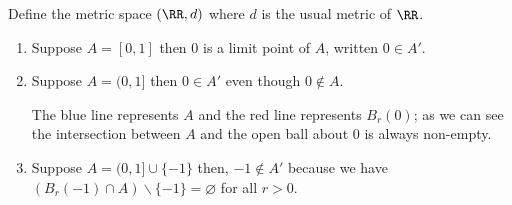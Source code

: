 \documentclass[12pt, a4paper]{article}
\begin{document}
\begin{mdexample}
    Define the metric space \((\RR,d)\) where \(d\) is the usual metric of \(\RR\).
    \begin{enumerate}
        \item Suppose \(A = [0,1]\) then \(0\) is a limit point of \(A\), written \(0 \in A'\).
        \item Suppose \(A = (0,1]\) then \( 0\in A'\) even though \(0 \not\in A\).
        \begin{figure}[H]
             \begin{center}
             \end{center}
        \end{figure}
        The blue line represents \(A\) and the red line represents \(B_r(0)\); as we can see the intersection between \(A\) and the open ball about \(0\) is always non-empty.
        \item Suppose \(A = (0,1]\cup \{-1\}\) then, \(-1 \not\in A'\) because we have \(\left( B_r(-1) \cap A \right) \backslash \{-1\} =\varnothing\) for all \(r>0\).
        \begin{figure}[H]
             \begin{center}
                \resizebox{10cm}{!}{%
                    \begin{tikzpicture}


\end{tikzpicture}}
\end{center}
\end{figure}
\end{enumerate}
\end{mdexample}
\end{document}
